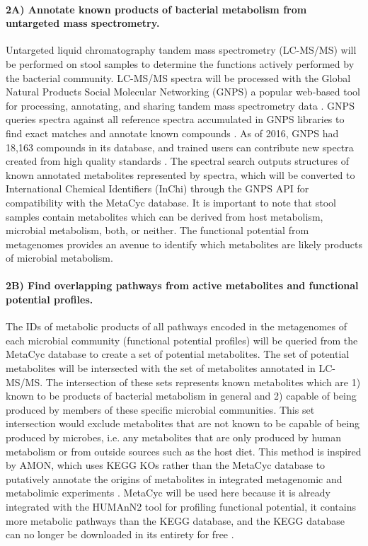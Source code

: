 \documentclass[11pt]{article}
\begin{document}
\paragraph{2A) Annotate known products of bacterial metabolism from untargeted mass spectrometry.}

Untargeted liquid chromatography tandem mass spectrometry (LC-MS/MS) will be performed on stool samples to determine the functions actively performed by the bacterial community.
LC-MS/MS spectra will be processed with the Global Natural Products Social Molecular Networking (GNPS) a popular web-based tool for processing, annotating, and sharing tandem mass spectrometry data \cite{wang_sharing_2016}.
GNPS queries spectra against all reference spectra accumulated in GNPS libraries to find exact matches and annotate known compounds \cite{aron_reproducible_2020}.
As of 2016, GNPS had 18,163 compounds in its database, and trained users can contribute new spectra created from high quality standards \cite{vargas_protocol_2019}.
The spectral search outputs structures of known annotated metabolites represented by spectra, which will be converted to International Chemical Identifiers (InChi) through the GNPS API for compatibility with the MetaCyc database.
It is important to note that stool samples contain metabolites which can be derived from host metabolism, microbial metabolism, both, or neither.
The functional potential from metagenomes provides an avenue to identify which metabolites are likely products of microbial metabolism.

\paragraph{2B) Find overlapping pathways from active metabolites and functional potential profiles.}

The IDs of metabolic products of all pathways encoded in the metagenomes of each microbial community (functional potential profiles) will be queried from the MetaCyc database to create a set of potential metabolites.
The set of potential metabolites will be intersected with the set of metabolites annotated in LC-MS/MS.
The intersection of these sets represents known metabolites which are 1) known to be products of bacterial metabolism in general and 2) capable of being produced by members of these specific microbial communities.
This set intersection would exclude metabolites that are not known to be capable of being produced by microbes, i.e. any metabolites that are only produced by human metabolism or from outside sources such as the host diet.
This method is inspired by AMON, which uses KEGG KOs rather than the MetaCyc database to putatively annotate the origins of metabolites in integrated metagenomic and metabolimic experiments \cite{shaffer_amon_2019}.
MetaCyc will be used here because it is already integrated with the HUMAnN2 tool for profiling functional potential,
it contains more metabolic pathways than the KEGG database,
and the KEGG database can no longer be downloaded in its entirety for free \cite{caspi_metacyc_2020}.
\end{document}
